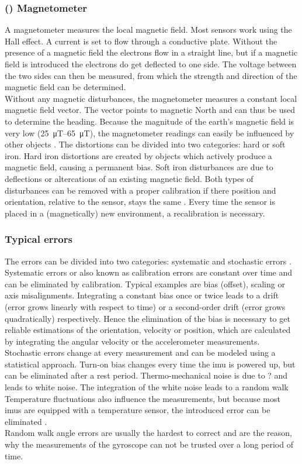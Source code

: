 \subsubsection{() Magnetometer}
A magnetometer measures the local magnetic field.
Most sensors work using the Hall effect.
A current is set to flow through a conductive plate.
Without the presence of a magnetic field the electrons flow in a straight line, but if a magnetic field is introduced the electrons do get deflected to one side.
The voltage between the two sides can then be measured, from which the strength and direction of the magnetic field can be determined.\\
Without any magnetic disturbances, the magnetometer measures a constant local magnetic field vector.
The vector points to magnetic North and can thus be used to determine the heading.
Because the magnitude of the earth's magnetic field is very low (\SIrange{25}{65}{\micro\tesla}), the magnetometer readings can easily be influenced by other objects \cite{Kok2016}.
The distortions can be divided into two categories: hard or soft iron.
Hard iron distortions are created by objects which actively produce a magnetic field, causing a permanent bias.
Soft iron disturbances are due to deflections or altercations of an existing magnetic field.
Both types of disturbances can be removed with a proper calibration if there position and orientation, relative to the sensor, stays the same \cite{Guo2008}.
Every time the sensor is placed in a (magnetically) new environment, a recalibration is necessary.

\subsubsection{Typical  errors}
The errors can be divided into two categories: systematic and stochastic errors \cite{Zhang2019}.
Systematic errors or also known as calibration errors are constant over time and can be eliminated by calibration.
Typical examples are bias (offset), scaling or axis misalignments.
Integrating a constant bias once or twice leads to a drift (error grows linearly with respect to time) or a second-order drift (error grows quadratically) respectively.
Hence the elimination of the bias is necessary to get reliable estimations of the orientation, velocity or position, which are calculated by integrating the angular velocity or the accelerometer measurements.\\
Stochastic errors change at every measurement and can be modeled using a statistical approach.
Turn-on bias changes every time the \gls{imu} is powered up, but can be eliminated after a rest period.
Thermo-mechanical noise is due to ? and leads to white noise.
The integration of the white noise leads to a random walk 
Temperature fluctuations also influence the measurements, but because most
\gls{imu}s are equipped with a temperature sensor, the introduced error can be eliminated \cite{Woodman07anintroduction}.\\
Random walk angle errors are usually the hardest to correct and are the reason, why the measurements of the gyroscope can not be trusted over a long period of time.


